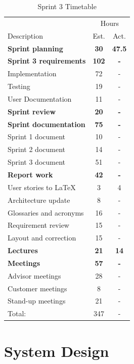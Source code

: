 \begin{table}[!htb] \small \center
\caption{Sprint 3 Timetable\label{tab:sprint3time}}
\begin{tabularx}{\textwidth}{X c c}
	\toprule
	& \multicolumn{2}{c}{Hours} \\
	\cmidrule(r){2-3}
	Description & Est. & Act. \\
	\midrule
	\textbf{Sprint planning} & \textbf{30} & \textbf{47.5} \\
	\addlinespace
	\textbf{Sprint 3 requirements} & \textbf{102} & \textbf{-} \\
	Implementation & 72 & - \\
	Testing & 19 & - \\
	User Documentation & 11 & - \\
	\addlinespace
	\textbf{Sprint review} & \textbf{20} & \textbf{-} \\
	\addlinespace
	\textbf{Sprint documentation} & \textbf{75} & \textbf{-} \\
	Sprint 1 document & 10 & -\\
	Sprint 2 document & 14 & - \\
	Sprint 3 document & 51 & - \\
	\addlinespace
	\textbf{Report work} & \textbf{42} & \textbf{-} \\
	User stories to LaTeX & 3 & 4\\
	Architecture update & 8 & -\\
	Glossaries and acronyms & 16 & -\\
	Requirement review & 15 & -\\
	Layout and correction & 15 & -\\
	\addlinespace
	\textbf{Lectures} & \textbf{21} & \textbf{14} \\
	\addlinespace
	\textbf{Meetings} & \textbf{57} & \textbf{-} \\
	Advisor meetings & 28 & - \\
	Customer meetings & 8 & - \\
	Stand-up meetings & 21 & - \\
	\midrule
	Total: & 347 & - \\
	\bottomrule
\end{tabularx}
\end{table}



\section{System Design}


